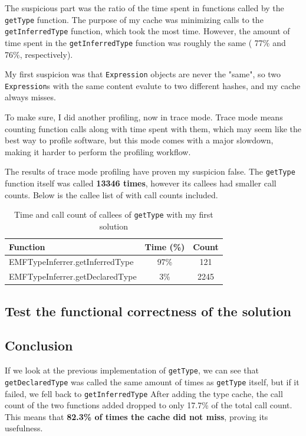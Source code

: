 \documentclass[11pt,a4paper,oneside]{report}
\begin{document}
The suspicious part was the ratio of the time spent in functions called by the
\texttt{getType} function. The purpose of my cache was minimizing calls to the
\texttt{getInferredType} function, which took the most time. However, the amount
of time spent in the \texttt{getInferredType} function was roughly the same (
77\% and 76\%, respectively).

My first suspicion was that \texttt{Expression} objects are never the "same",
so two \texttt{Expression}s with the same content evalute to two different
hashes, and my cache always misses.

To make sure, I did another profiling, now in trace mode. Trace mode means
counting function calls along with time spent with them, which may seem like the
best way to profile software, but this mode comes with a major slowdown, making
it harder to perform the profiling workflow.

The results of trace mode profiling have proven my suspicion false. The
\texttt{getType} function itself was called \textbf{13346 times}, however its
callees had smaller call counts. Below is the callee list of with call counts
included.

\begin{table}[ht]
    \footnotesize
    \centering
    \begin{tabular}{ l c c }
        \toprule
        Function & Time (\%)& Count \\
        \midrule
        EMFTypeInferrer.getInferredType & 97\% & 121 \\
        EMFTypeInferrer.getDeclaredType & 3\% & 2245 \\
        \bottomrule
    \end{tabular}
    \caption{Time and call count of callees of \texttt{getType} with my first solution}
    \label{tab:first-solution-call-counts}
\end{table}

\subsection{Test the functional correctness of the solution}

\subsection{Conclusion}
If we look at the previous implementation of \texttt{getType}, we can see that
\texttt{getDeclaredType} was called the same amount of times as
\texttt{getType} itself, but if it failed, we fell back to
\texttt{getInferredType} After adding the type cache, the call count of the two
functions added dropped to only 17.7\% of the total call count. This means that
\textbf{82.3\% of times the cache did not miss}, proving its usefulness.
\end{document}
